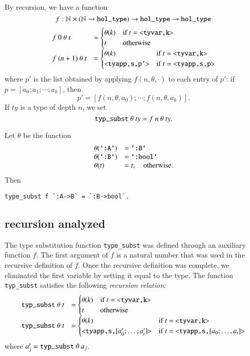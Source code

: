 By recursion, we have a function 
$$f:\ring{N}\times (\ring{N}\to \verb!hol_type!)\to \verb!hol_type! \to \verb!hol_type!$$
$$
\begin{array}{lll}
f~0~\theta~t &=\begin{cases} \theta(k) &\hbox{if } t = \verb!<tyvar,k>!\\ t &\hbox{otherwise}\end{cases}\\
f~(n+1)~\theta~t &=\begin{cases} \theta(k) &\hbox{if } t = \verb!<tyvar,k>!\\ \verb!<tyapp,s,p'>! &\hbox{if } t = \verb!<tyapp,s,p>!\end{cases}\\
\end{array}
$$
where $p'$ is the list obtained by applying $f(n,\theta,\cdot)$ to each entry of $p'$:
if $p=[a_0;a_1;\cdots;a_k]$, then
$$
p' = [f(n,\theta,a_0);\cdots;f(n,\theta,a_k)].
$$
If $ty$ is a type of depth $n$, we set
\begin{equation}
\verb!typ_subst!~\theta~ty = f~n~\theta~ty.
\end{equation}

\begin{example}
Let $\theta$ be the function
$$
\begin{array}{lll}
\theta(\verb!`:A`!) &=\verb!`:B`!\\
\theta(\verb!`:B`!) &=\verb!`:bool`!\\
\theta(t) &= t,\quad\hbox{otherwise}.
\end{array}
$$
Then
\begin{verbatim}
type_subst f `:A->B` = `:B->bool`.
\end{verbatim}
\end{example}

\subsection{recursion analyzed}

The type substitution function \verb!type_subst! was defined through an auxiliary function $f$.  The first
argument of $f$ is a natural number that was used in the recursive definition of $f$.  Once the recursive definition was complete, we eliminated the first variable by setting it equal to the type.  The function \verb!typ_subst! satisfies the following {\it recursion relation}:
$$
\begin{array}{lll}
\verb!typ_subst!~\theta~t &=\begin{cases} \theta(k) &\hbox{if } t = \verb!<tyvar,k>!\\ t &\hbox{otherwise}\end{cases}\\
\verb!typ_subst!~\theta~t &=\begin{cases} \theta(k) &\hbox{if } t = \verb!<tyvar,k>!\\ \verb!<tyapp,s,![a'_0;\ldots;a'_i]\verb!>! &\hbox{if } t = \verb!<tyapp,s,![a_0;\ldots,a_i]\verb!>!\end{cases}\\
\end{array}
$$
where $a'_j = \verb!typ_subst!~\theta~a_j$.

